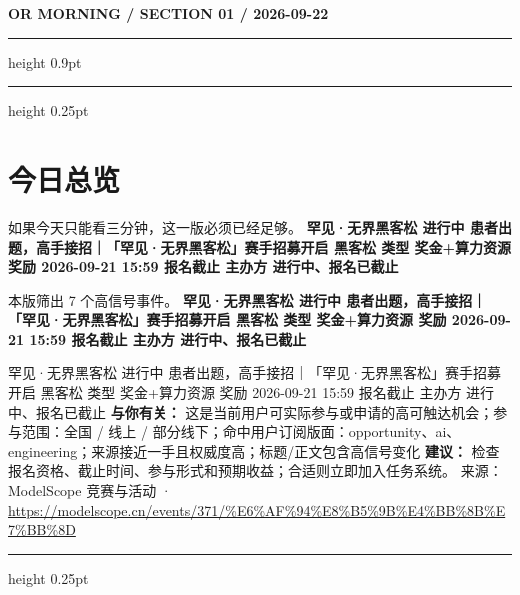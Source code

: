 \documentclass[10.5pt]{ctexart}
\begin{document}
{\small\bfseries OR MORNING / SECTION 01 / 2026-09-22}
\vspace{2mm}
\hrule height 0.9pt
\vspace{1.5mm}
\hrule height 0.25pt
\vspace{4mm}
\section*{今日总览}
{\color{ormuted} 如果今天只能看三分钟，这一版必须已经足够。}
\vspace{2mm}
{\fontsize{25}{29}\selectfont\bfseries 罕见·无界黑客松 进行中 患者出题，高手接招｜「罕见·无界黑客松」赛手招募开启 黑客松 类型 奖金+算力资源 奖励 2026-09-21 15:59 报名截止 主办方 进行中、报名已截止}\par
\vspace{2mm}
{\large 本版筛出 7 个高信号事件。}
\vspace{3mm}
{\Large\bfseries 罕见·无界黑客松 进行中 患者出题，高手接招｜「罕见·无界黑客松」赛手招募开启 黑客松 类型 奖金+算力资源 奖励 2026-09-21 15:59 报名截止 主办方 进行中、报名已截止}\par
罕见·无界黑客松 进行中 患者出题，高手接招｜「罕见·无界黑客松」赛手招募开启 黑客松 类型 奖金+算力资源 奖励 2026-09-21 15:59 报名截止 主办方 进行中、报名已截止
\textbf{与你有关：} 这是当前用户可实际参与或申请的高可触达机会；参与范围：全国 / 线上 / 部分线下；命中用户订阅版面：opportunity、ai、engineering；来源接近一手且权威度高；标题/正文包含高信号变化
\textbf{建议：} 检查报名资格、截止时间、参与形式和预期收益；合适则立即加入任务系统。
{\footnotesize\color{ormuted} 来源：ModelScope 竞赛与活动 · \url{https://modelscope.cn/events/371/%E6%AF%94%E8%B5%9B%E4%BB%8B%E7%BB%8D}}
\vspace{3mm}
\hrule height 0.25pt
\vspace{3mm}
\end{document}
